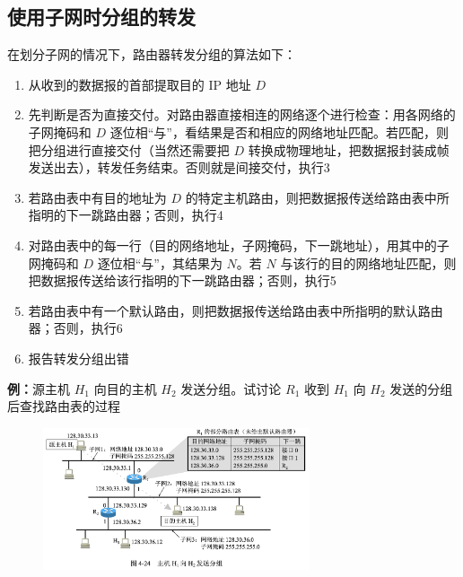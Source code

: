 \documentclass[cs4size,a4paper,10pt]{ctexart}
\begin{document}
	\subsection{使用子网时分组的转发}
	在划分子网的情况下，路由器转发分组的算法如下：
	\begin{enumerate}[label=\arabic*.]
		\item 从收到的数据报的首部提取目的 IP 地址 $D$
		\item 先判断是否为直接交付。对路由器直接相连的网络逐个进行检查：用各网络的子网掩码和 $D$ 逐位相“与”，看结果是否和相应的网络地址匹配。若匹配，则把分组进行直接交付（当然还需要把 $D$ 转换成物理地址，把数据报封装成帧发送出去），转发任务结束。否则就是间接交付，执行3
		\item 若路由表中有目的地址为 $D$ 的特定主机路由，则把数据报传送给路由表中所指明的下一跳路由器；否则，执行4
		\item 对路由表中的每一行（目的网络地址，子网掩码，下一跳地址），用其中的子网掩码和 $D$ 逐位相“与”，其结果为 $N$。若 $N$ 与该行的目的网络地址匹配，则把数据报传送给该行指明的下一跳路由器；否则，执行5
		\item 若路由表中有一个默认路由，则把数据报传送给路由表中所指明的默认路由器；否则，执行6
		\item 报告转发分组出错
	\end{enumerate}

	\textbf{例：}源主机 $H_1$ 向目的主机 $H_2$ 发送分组。试讨论 $R_1$ 收到 $H_1$ 向 $H_2$ 发送的分组后查找路由表的过程
	\begin{figure}[H]
		\centering
		\includegraphics[width=0.7\textwidth]{img/4.24}
	\end{figure}
\end{document}
